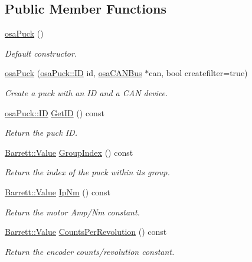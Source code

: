 \subsection*{Public Member Functions}
\begin{DoxyCompactItemize}
\item 
\hyperlink{classosa_puck_a48e807c1fc536f0ee1ae2683b497898d}{osa\-Puck} ()
\begin{DoxyCompactList}\small\item\em Default constructor. \end{DoxyCompactList}\item 
\hyperlink{classosa_puck_a6359231c1e52328b83d362b7599adebd}{osa\-Puck} (\hyperlink{classosa_puck_aa484456bae759574accdc76fe68b4685}{osa\-Puck\-::\-I\-D} id, \hyperlink{classosa_c_a_n_bus}{osa\-C\-A\-N\-Bus} $\ast$can, bool createfilter=true)
\begin{DoxyCompactList}\small\item\em Create a puck with an I\-D and a C\-A\-N device. \end{DoxyCompactList}\item 
\hyperlink{classosa_puck_aa484456bae759574accdc76fe68b4685}{osa\-Puck\-::\-I\-D} \hyperlink{classosa_puck_a9b9e0f8cc240cafbaee88a4cb25028e6}{Get\-I\-D} () const 
\begin{DoxyCompactList}\small\item\em Return the puck I\-D. \end{DoxyCompactList}\item 
\hyperlink{struct_barrett_a57ff132885344ca62e4b4b691885685b}{Barrett\-::\-Value} \hyperlink{classosa_puck_acc4f438b1a7d4b8d6f12ebb981c3591e}{Group\-Index} () const 
\begin{DoxyCompactList}\small\item\em Return the index of the puck within its group. \end{DoxyCompactList}\item 
\hyperlink{struct_barrett_a57ff132885344ca62e4b4b691885685b}{Barrett\-::\-Value} \hyperlink{classosa_puck_ad7455cc914b716961b282f5f7f887b51}{Ip\-Nm} () const 
\begin{DoxyCompactList}\small\item\em Return the motor Amp/\-Nm constant. \end{DoxyCompactList}\item 
\hyperlink{struct_barrett_a57ff132885344ca62e4b4b691885685b}{Barrett\-::\-Value} \hyperlink{classosa_puck_ae4999be0a82215645fcd400264aa0f19}{Counts\-Per\-Revolution} () const 
\begin{DoxyCompactList}\small\item\em Return the encoder counts/revolution constant. \end{DoxyCompactList}\item 

\end{DoxyCompactItemize}
